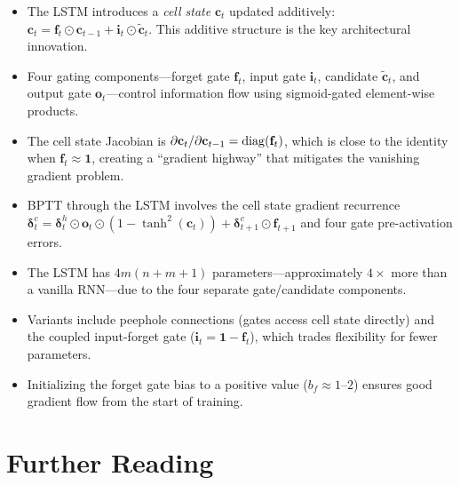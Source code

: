 \documentclass[11pt,a4paper]{article}
\begin{document}
\begin{itemize}
  \item The LSTM introduces a \emph{cell state} $\mathbf{c}_t$
    updated additively:
    $\mathbf{c}_t = \mathbf{f}_t \odot \mathbf{c}_{t-1} +
    \mathbf{i}_t \odot \tilde{\mathbf{c}}_t$.  This additive
    structure is the key architectural innovation.
  \item Four gating components---forget gate $\mathbf{f}_t$, input
    gate $\mathbf{i}_t$, candidate $\tilde{\mathbf{c}}_t$, and
    output gate $\mathbf{o}_t$---control information flow using
    sigmoid-gated element-wise products.
  \item The cell state Jacobian is
    $\partial \mathbf{c}_t / \partial \mathbf{c}_{t-1} =
    \operatorname{diag}(\mathbf{f}_t)$, which is close to the identity when
    $\mathbf{f}_t \approx \mathbf{1}$, creating a ``gradient highway''
    that mitigates the vanishing gradient problem.
  \item BPTT through the LSTM involves the cell state gradient
    recurrence $\boldsymbol{\delta}_t^c =
    \boldsymbol{\delta}_t^h \odot \mathbf{o}_t \odot
    (1 - \tanh^2(\mathbf{c}_t)) +
    \boldsymbol{\delta}_{t+1}^c \odot \mathbf{f}_{t+1}$
    and four gate pre-activation errors.
  \item The LSTM has $4m(n + m + 1)$ parameters---approximately
    $4\times$ more than a vanilla RNN---due to the four separate
    gate/candidate components.
  \item Variants include peephole connections (gates access cell
    state directly) and the coupled input-forget gate
    ($\mathbf{i}_t = \mathbf{1} - \mathbf{f}_t$), which trades
    flexibility for fewer parameters.
  \item Initializing the forget gate bias to a positive value
    ($b_f \approx 1$--$2$) ensures good gradient flow from the
    start of training.
\end{itemize}

\section{Further Reading}
\label{sec:further-reading}
\end{document}
